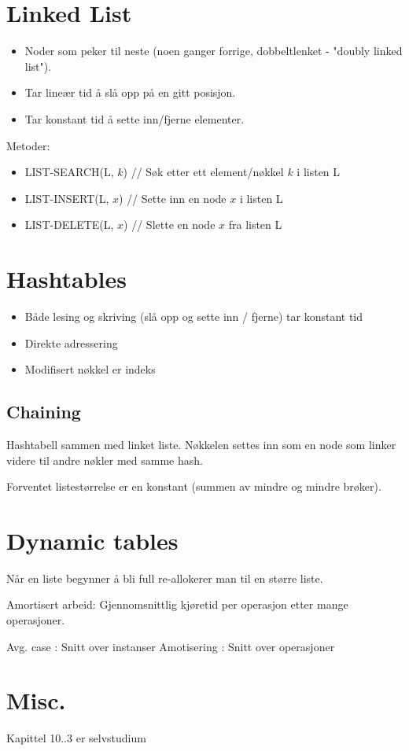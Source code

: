 \documentclass{article}
\begin{document}
\begin{itemize}
			\section{Linked List}
				\begin{itemize}
					\item 	Noder som peker til neste (noen ganger forrige, dobbeltlenket - "doubly linked list").
					\item Tar lineær tid å slå opp på en gitt posisjon.
					\item Tar konstant tid å sette inn/fjerne elementer.
				\end{itemize}
				Metoder:
				\begin{itemize}
					\item LIST-SEARCH(L, $k$)  // Søk etter ett element/nøkkel $k$ i listen L
					\item LIST-INSERT(L, $x$) // Sette inn en node $x$ i listen L
					\item LIST-DELETE(L, $x$) // Slette en node $x$ fra listen L
				\end{itemize}
			
			
			
			\section{Hashtables}
				\begin{itemize}
					\item Både lesing og skriving (slå opp og sette inn / fjerne) tar konstant tid
					\item Direkte adressering
					\item Modifisert nøkkel er indeks
				\end{itemize}
			
				\subsection{Chaining}
					Hashtabell sammen med linket liste. Nøkkelen settes inn som en node som linker videre til andre nøkler med samme hash.
					
					Forventet listestørrelse er en konstant (summen av mindre og mindre brøker).
			
			
			\section{Dynamic tables}
				Når en liste begynner å bli full re-allokerer man til en større liste.
				
				Amortisert arbeid: Gjennomsnittlig kjøretid per operasjon etter mange operasjoner.
				
				Avg. case : Snitt over instanser \newline
				Amotisering : Snitt over operasjoner
			
			\section{Misc.}
				Kapittel 10..3 er selvstudium
			
		\end{itemize}
		
	
\end{document}
